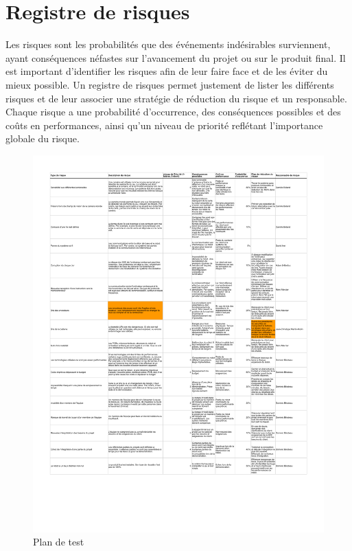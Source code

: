 \chapter{Registre de risques}

Les risques sont les probabilités que des événements indésirables surviennent, ayant conséquences néfastes sur l'avancement du projet ou sur le produit final. Il est important d'identifier les risques afin de leur faire face et de les éviter du mieux possible. Un registre de risques permet justement de lister les différents risques et de leur associer une stratégie de réduction du risque et un responsable. Chaque risque a une probabilité d'occurrence, des conséquences possibles et des coûts en performances, ainsi qu'un niveau de priorité reflétant l'importance globale du risque.

\begin{figure}
  \centering
  \includegraphics[scale=0.80, angle=0]{resources/risques.pdf}
  \caption{Plan de test}
\end{figure}


